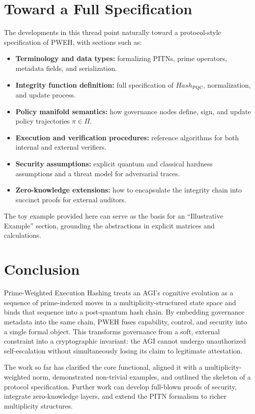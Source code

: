 \documentclass[11pt]{article}
\begin{document}
\section{Toward a Full Specification}

The developments in this thread point naturally toward a protocol-style specification of PWEH, with sections such as:

\begin{itemize}[leftmargin=1.5em]
  \item \textbf{Terminology and data types:} formalizing PITNs, prime operators, metadata fields, and serialization.
  \item \textbf{Integrity function definition:} full specification of \(Hash_{\text{PQC}}\), normalization, and update process.
  \item \textbf{Policy manifold semantics:} how governance nodes define, sign, and update policy trajectories \(\pi \in \Pi\).
  \item \textbf{Execution and verification procedures:} reference algorithms for both internal and external verifiers.
  \item \textbf{Security assumptions:} explicit quantum and classical hardness assumptions and a threat model for adversarial traces.
  \item \textbf{Zero-knowledge extensions:} how to encapsulate the integrity chain into succinct proofs for external auditors.
\end{itemize}

The toy example provided here can serve as the basis for an ``Illustrative Example'' section, grounding the abstractions in explicit matrices and calculations.

\section{Conclusion}

Prime-Weighted Execution Hashing treats an AGI's cognitive evolution as a sequence of prime-indexed moves in a multiplicity-structured state space and binds that sequence into a post-quantum hash chain.
By embedding governance metadata into the same chain, PWEH fuses capability, control, and security into a single formal object.
This transforms governance from a soft, external constraint into a cryptographic invariant:
the AGI cannot undergo unauthorized self-escalation without simultaneously losing its claim to legitimate attestation.

The work so far has clarified the core functional, aligned it with a multiplicity-weighted norm, demonstrated non-trivial examples, and outlined the skeleton of a protocol specification.
Further work can develop full-blown proofs of security, integrate zero-knowledge layers, and extend the PITN formalism to richer multiplicity structures.
\end{document}
